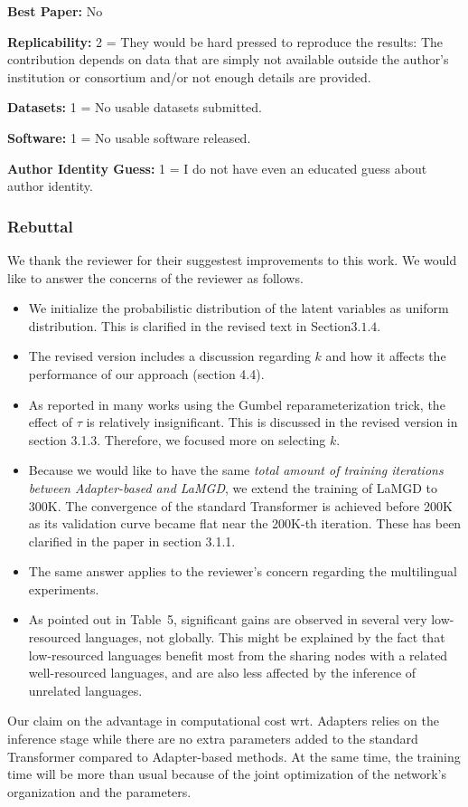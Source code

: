 \documentclass[12pt,times,a4paper,twoside]{article}
\theoremstyle{definition}
\begin{document}
\textbf{Best Paper:} No

\textbf{Replicability:} 2 = They would be hard pressed to reproduce the results: The contribution depends on data that are simply not available outside the author's institution or consortium and/or not enough details are provided.

\textbf{Datasets:} 1 = No usable datasets submitted.

\textbf{Software:} 1 = No usable software released.

\textbf{Author Identity Guess:} 1 = I do not have even an educated guess about author identity.

\subsubsection*{Rebuttal}
{\color{blue}%
We thank the reviewer for their suggestest improvements to this work. We would like to answer the concerns of the reviewer as follows.

\begin{itemize}
\item We initialize the probabilistic distribution of the latent variables as uniform distribution. This is clarified in the revised text in Section$3.1.4$.\done{}
\item The revised version includes a discussion regarding $k$ and how it affects the performance of our approach (section 4.4).
\item As reported in many works using the Gumbel reparameterization trick, the effect of $\tau$ is relatively insignificant. This is discussed in the revised version in section 3.1.3. \done{}Therefore, we focused more on selecting $k$. 
\item Because we would like to have the same \emph{total amount of training iterations between Adapter-based and LaMGD}, we extend the training of LaMGD to 300K. The convergence of the standard Transformer is achieved before 200K as its validation curve became flat near the 200K-th iteration. These has been clarified in the paper in section 3.1.1. \done{} 
\item The same answer applies to the reviewer's concern regarding the multilingual experiments.
\item As pointed out\done{} in Table~5, significant gains are observed in several very low-resourced languages, not globally. This might be explained by the fact that low-resourced languages benefit most from the sharing nodes with a related well-resourced languages, and are also less affected by the inference of unrelated languages.
\end{itemize}

Our claim on the advantage in computational cost wrt. Adapters relies on the inference stage while there are no extra parameters added to the standard Transformer compared to Adapter-based methods. At the same time, the training time will be more than usual because of the joint optimization of the network's organization and the parameters. 
}%
\end{document}
